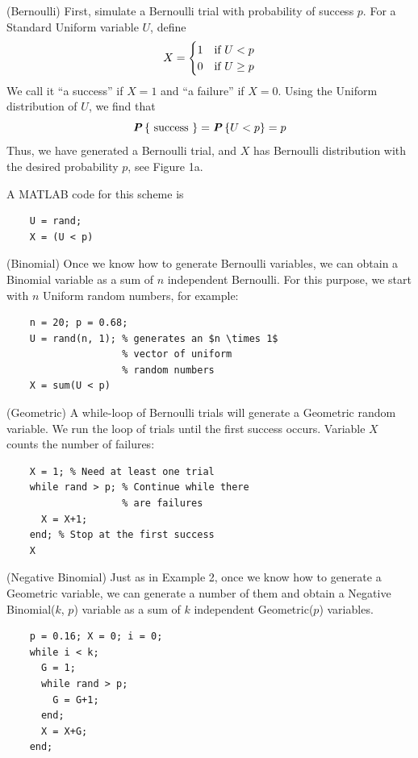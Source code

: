 \begin{example}{ (Bernoulli)}
  First, simulate a Bernoulli trial with probability of success $p$. For a Standard Uniform variable $U$, define
  \begin{equation*}
    X = \begin{cases}
      1 &\textnormal{if } U < p\\
      0 &\textnormal{if } U \geq p
    \end{cases}
  \end{equation*}
  We call it ``a success'' if $X = 1$ and ``a failure'' if $X = 0$. Using the Uniform distribution of $U$, we find that
  \begin{equation*}
    \textbf{\textit{P}}\left\{\textnormal{ success }\right\} = \textbf{\textit{P}}\left\{U < p\right\} = p
  \end{equation*}
  Thus, we have generated a Bernoulli trial, and $X$ has Bernoulli distribution with the desired probability $p$, see Figure 1a.

  A MATLAB code for this scheme is
  \begin{verbatim}
    U = rand;
    X = (U < p)
  \end{verbatim}
\end{example}

\begin{example}{ (Binomial)}
  Once we know how to generate Bernoulli variables, we can obtain a Binomial variable as a sum of $n$ independent Bernoulli. For this purpose, we start with $n$ Uniform random numbers, for example:
  \begin{verbatim}
    n = 20; p = 0.68;
    U = rand(n, 1); % generates an $n \times 1$ 
                    % vector of uniform 
                    % random numbers
    X = sum(U < p)
  \end{verbatim}
\end{example}

\begin{example}{ (Geometric)}
  A while-loop of Bernoulli trials will generate a Geometric random variable. We run the loop of trials until the first success occurs. Variable $X$ counts the number of failures:
  \begin{verbatim}
    X = 1; % Need at least one trial
    while rand > p; % Continue while there
                    % are failures
      X = X+1;
    end; % Stop at the first success
    X
  \end{verbatim}
\end{example}

\begin{example}{ (Negative Binomial)}
  Just as in Example 2, once we know how to generate a Geometric variable, we can generate a number of them and obtain a Negative Binomial($k$, $p$) variable as a sum of $k$ independent Geometric($p$) variables.
  \begin{verbatim}
    p = 0.16; X = 0; i = 0;
    while i < k;
      G = 1;
      while rand > p;
        G = G+1;
      end;
      X = X+G;
    end;    
  \end{verbatim}
\end{example}

